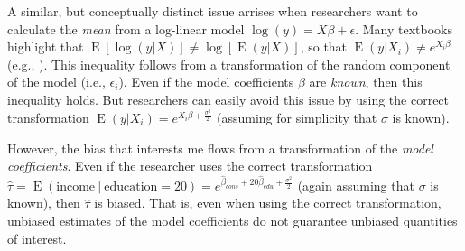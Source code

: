 \documentclass[12pt]{article}
\DeclareMathOperator*{\E}{\text{E}}
\begin{document}
A similar, but conceptually distinct issue arrises when researchers want to calculate the \textit{mean} from a log-linear model $\log(y) = X\beta + \epsilon$. 
Many textbooks highlight that $\E[\log(y|X)] \neq \log[\E(y|X)]$, so that $\E(y | X_i) \neq e^{X_i\beta}$ (e.g., \citealt{Wooldridge2013}). 
This inequality follows from a transformation of the random component of the model (i.e., $\epsilon_i$). 
Even if the model coefficients $\beta$ are \textit{known}, then this inequality holds. 
But researchers can easily avoid this issue by using the correct transformation $\E(y | X_i) = e^{X_i\beta + \frac{\sigma^2}{2}}$ (assuming for simplicity that $\sigma$ is known).

However, the bias that interests me flows from a transformation of the \textit{model coefficients}. 
Even if the researcher uses the correct transformation $\hat{\tau} = \E(\text{income}~|~\text{education} = 20) = e^{\hat{\beta}_{cons} + 20\hat{\beta}_{edu} + \frac{\sigma^2}{2}}$ (again assuming that $\sigma$ is known), then $\hat{\tau}$ is biased. 
That is, even when using the correct transformation, unbiased estimates of the model coefficients do not guarantee unbiased quantities of interest.
\end{document}
